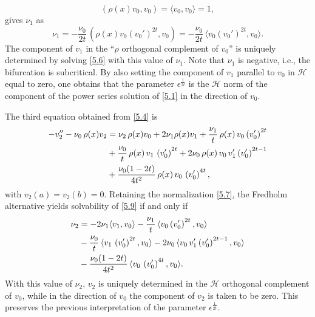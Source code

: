 \documentclass[final]{siamltex}
\numberwithin{equation}{section}
\begin{document}
\begin{equation} \label{5.7}
\left(\rho(x) v_0, v_0\right) = \langle v_0, v_0\rangle=1,
\end{equation}
gives $\nu_1$ as
\begin{equation} \label{5.8}
\nu_1= -\frac{\nu_0}{2 t} \, \left(\rho(x) v_0 (v_0')^{2t}, v_0\right)=  -\frac{\nu_0}{2 t} \, \langle
v_0 (v_0')^{2t}, v_0 \rangle.
\end{equation}
The component of $v_1$ in the ``$\rho$ orthogonal complement of $v_0$'' is uniquely determined by solving \eqref{5.6} with this value of $\nu_1$. Note that $\nu_1$ is negative, i.e., the bifurcation is subcritical. By also setting the component of $v_1$ parallel to $v_0$ in $\mathcal{H}$ equal to zero, one obtains that the parameter $\epsilon^{\frac{1}{2t}}$ is the $\mathcal{H}$ norm of the component of the power series solution of \eqref{5.1} in the direction of $v_0$.

The third equation obtained from \eqref{5.4} is
\begin{align} \label{5.9}
-v_2'' - \nu_0 \, \rho(x) v_2 &= \nu_2 \, \rho(x) v_0 + 2 \nu_1 \rho(x) v_1 + \frac{\nu_1}{t} \, \rho(x) \, v_0 \left(v_0'\right)^{2t} \notag \\
&+ \frac{\nu_0}{t} \,  \rho(x) \, v_1 \, \left(v_0'\right)^{2t}+ 2 \nu_0 \, \rho(x) \, v_0 \, v_1' \left(v_0'\right)^{2t-1}\notag \\
&+\frac{\nu_0 (1-2t)}{4 t^2} \, \rho(x) \, v_0 \, \left(v_0'\right)^{4t},
\end{align}
with $v_2 (a) =v_2(b)=0$. Retaining the normalization \eqref{5.7}, the Fredholm
alternative yields solvability of \eqref{5.9} if and only if
\begin{align} \label{5.10}
\nu_2 &= - 2 \nu_1 \langle v_1, v_0\rangle - \frac{\nu_1}{t} \, \langle v_0 \left(v_0'\right)^{2t}, v_0\rangle \notag \\
&- \frac{\nu_0}{t} \,  \langle v_1 \, \left(v_0'\right)^{2t}, v_0\rangle
- 2 \nu_0 \, \langle v_0 \, v_1' \left(v_0'\right)^{2t-1}, v_0\rangle \notag \\
&-\frac{\nu_0 (1-2t)}{4 t^2} \, \langle v_0 \, \left(v_0'\right)^{4t}, v_0\rangle.
\end{align}
With this value of $\nu_2$, $v_2$ is uniquely determined in the $\mathcal{H}$ orthogonal complement of $v_0$, while in the direction of $v_0$ the component of $v_2$ is taken to be zero. This preserves the previous interpretation of the parameter $\epsilon^{\frac{1}{2t}}$.
\end{document}

